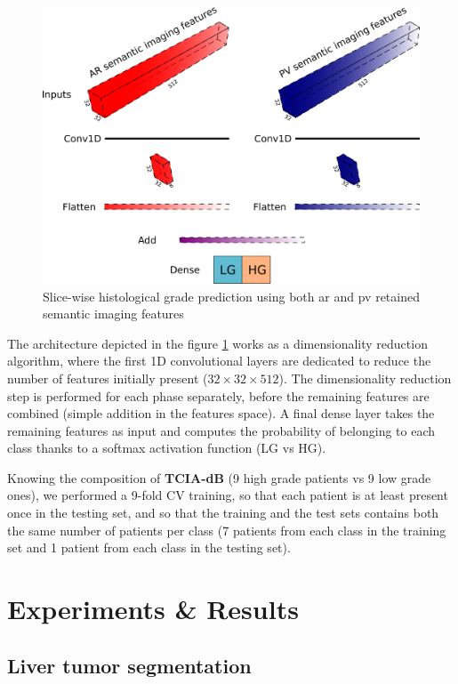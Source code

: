 \documentclass[]{article}
\newcommand{\lmttfont}[1]{{\fontfamily{lmtt}\selectfont #1}}
\begin{document}
\begin{figure}[!ht]
	\centering
	\includegraphics[width=0.9\linewidth]{../HistologicalGradePrediction/images/gradpredictionArchitecture}
	\caption{Slice-wise histological grade prediction using both \ac{ar} and \ac{pv} retained semantic imaging features}
	\label{fig:gradpredictionArchitecture}
\end{figure}

The architecture depicted in the figure \ref{fig:gradpredictionArchitecture} works as a dimensionality
reduction algorithm, where the first 1D convolutional layers are dedicated to
reduce the number of features initially present ($ 32\times32\times512 $). The
dimensionality reduction step is performed for each phase separately,
before the remaining features are combined (simple addition in the
features space).
A final dense layer takes the remaining features as input and computes
the probability of belonging to each class thanks to a softmax activation
function (LG vs HG).

Knowing the composition of \textbf{\lmttfont{TCIA-dB}} (9 high grade patients vs 9 low
grade ones), we performed a 9-fold CV training, so that each patient is
at least present once in the testing set, and so that the training and
the test sets contains both the same number of patients per
class (7 patients from each class in the training set and 1 patient from
each class in the testing set).

\section{Experiments \& Results}


\subsection{Liver tumor segmentation}
\end{document}
